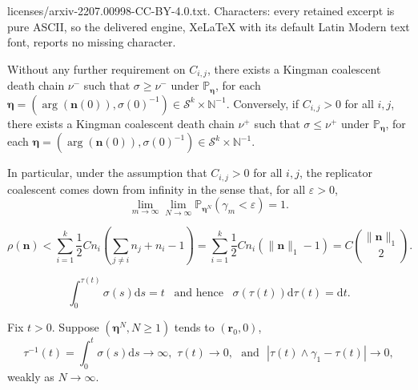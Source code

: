 \documentclass[10pt,a4paper]{amsart}
\newcommand{\dd}{{\mathrm d}}
\newcommand*{\norm}[1]{\lVert #1 \rVert}
\begin{document}
licenses/arxiv-2207.00998-CC-BY-4.0.txt. Characters: every retained excerpt is pure ASCII, so the delivered engine, XeLaTeX with its default Latin Modern text font, reports no missing character.
\begin{lemma}\label{comingdownfrominfinity}
Without any further requirement on $C_{i,j}$, there exists a Kingman coalescent death chain $\nu^-$ such that $\sigma\geq \nu^-$ under $\mathbb{P}_{\bm\eta}$, for each ${\bm \eta} = (\arg({\bm n}(0)), \sigma(0)^{-1})\in \mathcal{S}^k\times \mathbb{N}^{-1}$. 
Conversely, if $C_{i,j}>0$ for all $i,j$, there exists a Kingman coalescent death chain $\nu^+$ such that $\sigma\leq \nu^+$ under $\mathbb{P}_{\bm\eta}$, for each ${\bm \eta} = (\arg({\bm n}(0)), \sigma(0)^{-1})\in \mathcal{S}^k\times \mathbb{N}^{-1}$. 

In particular, under the  assumption that $C_{i,j}>0$ for all $i,j$,
the replicator coalescent comes down from infinity  in the sense that, for all $\varepsilon>0$, 
\[
\lim_{m\to\infty}\lim_{N\to\infty}\mathbb{P}_{\bm\eta^N}(\gamma_m<\varepsilon) = 1.
\]
\end{lemma}

\begin{equation}
\rho(\bm{n})
<
\sum_{i=1}^k\frac{1}{2}Cn_i\left(\sum_{j\neq i}n_{j} +  n_i-1\right) = 
\sum_{i=1}^k\frac{1}{2}Cn_i(\norm{\bm n}_1-1) = {C} {\norm{\bm n}_1 \choose 2}.
%
%
\label{rhoupper}
\end{equation}

\begin{equation}
\int_0^{\tau(t)} \sigma(s)\dd s = t \,\,\,\text{ and hence } \,\,\, \sigma(\tau(t))\dd \tau(t) = \dd t %
\label{dt}.
\end{equation}

\begin{lemma}\label{cor1} Fix $t>0$. Suppose $(\bm \eta^N, N\geq 1)$ tends to $( \bm r_0, 0)$,  
\[
\tau^{-1}(t) =   \int^{t}_0 \sigma(s)\dd s \to \infty, \, \,  \tau(t)\to 0,\, \, \text{ and }\,\, |\tau(t)\wedge \gamma_1-\tau(t)|\to0,
\]
weakly as $N\to\infty$.
\end{lemma}
\end{document}

